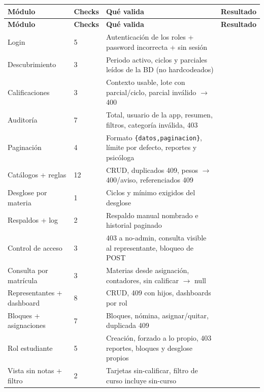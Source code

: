 \documentclass[11pt,a4paper]{article}
\begin{document}
{\small
\begin{longtable}{|p{}|p{}|p{}|p{}|}
\rowcolor{UTECblue}\color{white}\bfseries Módulo & \color{white}\bfseries Checks & \color{white}\bfseries Qué valida & \color{white}\bfseries Resultado \\ \hline
\endfirsthead
\rowcolor{UTECblue}\color{white}\bfseries Módulo & \color{white}\bfseries Checks & \color{white}\bfseries Qué valida & \color{white}\bfseries Resultado \\ \hline
\endhead
Login & 5 & Autenticación de los roles + password incorrecta + sin sesión & {\color{green!60!black}{$\checkmark$}} \\ \hline
Descubrimiento & 3 & Periodo activo, ciclos y parciales leídos de la BD (no hardcodeados) & {\color{green!60!black}{$\checkmark$}} \\ \hline
Calificaciones & 3 & Contexto usable, lote con parcial/ciclo, parcial inválido {$\rightarrow$} 400 & {\color{green!60!black}{$\checkmark$}} \\ \hline
Auditoría & 7 & Total, usuario de la app, resumen, filtros, categoría inválida, 403 & {\color{green!60!black}{$\checkmark$}} \\ \hline
Paginación & 4 & Formato \texttt{\{datos,paginacion\}}, límite por defecto, reportes y psicóloga & {\color{green!60!black}{$\checkmark$}} \\ \hline
Catálogos + reglas & 12 & CRUD, duplicados 409, pesos {$\rightarrow$} 400/aviso, referenciados 409 & {\color{green!60!black}{$\checkmark$}} \\ \hline
Desglose por materia & 1 & Ciclos y mínimo exigidos del desglose & {\color{green!60!black}{$\checkmark$}} \\ \hline
Respaldos + log & 2 & Respaldo manual nombrado e historial paginado & {\color{green!60!black}{$\checkmark$}} \\ \hline
Control de acceso & 3 & 403 a no-admin, consulta visible al representante, bloqueo de POST & {\color{green!60!black}{$\checkmark$}} \\ \hline
Consulta por matrícula & 3 & Materias desde asignación, contadores, sin calificar {$\rightarrow$} null & {\color{green!60!black}{$\checkmark$}} \\ \hline
Representantes + dashboard & 8 & CRUD, 409 con hijos, dashboards por rol & {\color{green!60!black}{$\checkmark$}} \\ \hline
Bloques + asignaciones & 7 & Bloques, nómina, asignar/quitar, duplicada 409 & {\color{green!60!black}{$\checkmark$}} \\ \hline
Rol estudiante & 5 & Creación, forzado a lo propio, 403 reportes, bloques y desglose propios & {\color{green!60!black}{$\checkmark$}} \\ \hline
Vista sin notas + filtro & 2 & Tarjetas sin-calificar, filtro de curso incluye sin-curso & {\color{green!60!black}{$\checkmark$}} \\ \hline
\end{longtable}}
\end{document}
